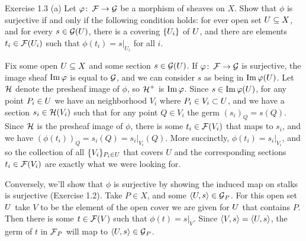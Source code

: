 
\begin{exercise}{Exercise 1.3 (a)}
    Let $\varphi \colon \operatorname{\mathcal{F}} \to \operatorname{\mathcal{G}}$ be a morphism of sheaves on $X$.
    Show that $\phi$ is surjective if and only if 
    the following condition holds: for ever open set $U \subseteq X$,
    and for every $s \in \operatorname{\mathcal{G}}(U)$, 
    there is a covering $\{U_i\}$ of $U$,
    and there are elements $t_i \in \operatorname{\mathcal{F}}(U_i)$
    such that $\phi(t_i) = s|_{U_i}$ for all $i$.
\end{exercise}
\begin{solution}
    Fix some open $U \subseteq X$ 
    and some section $s \in \operatorname{\mathcal{G}}(U)$.
    If $\varphi \colon \operatorname{\mathcal{F}} \to \operatorname{\mathcal{G}}$ is surjective,
    the image sheaf $\operatorname{Im} \varphi$ is equal to $\operatorname{\mathcal{G}}$,
    and we can consider $s$ as being in $\operatorname{Im}\varphi(U)$.
    Let $\operatorname{\mathcal{H}}$ denote the presheaf image of $\phi$,
    so $\operatorname{\mathcal{H}}^+$ is $\operatorname{Im}\varphi$.
    Since $s \in \operatorname{Im}\varphi(U)$, 
    for any point $P_i \in U$ we have an neighborhood $V_i$ 
    where $P_i \in V_i \subset U$,
    and we have a section $s_i \in \operatorname{\mathcal{H}}(V_i)$ such that
    for any point $Q \in V_i$ the germ $(s_i)_Q = s(Q)$.
    Since $\operatorname{\mathcal{H}}$ is the presheaf image of $\phi$, 
    there is some $t_i \in \operatorname{\mathcal{F}}(V_i)$ that maps to $s_i$,
    and we have $(\phi(t_i))_Q = s_i(Q) = s_i|_{V_i}(Q)$.
    More succinctly, $\phi(t_i) = s_i|_{V_i}$, 
    and so the collection of all $\{V_i\}_{P_i \in U}$ that covers $U$ 
    and the corresponding sections $t_i \in \operatorname{\mathcal{F}}(V_i)$ 
    are exactly what we were looking for.
    
    Conversely, we'll show that $\phi$ is surjective 
    by showing the induced map on stalks is surjective (Exercise 1.2).
    Take $P \in X$, and some $\langle U, s \rangle \in \operatorname{\mathcal{G}}_P$.
    For this open set $U$ take $V$ to be the element
    of the open cover we are given for $U$ that contains $P$. 
    Then there is some $t \in \operatorname{\mathcal{F}}(V)$ such that $\phi(t) = s|_V$.
    Since $\langle V, s \rangle = \langle U, s \rangle$,
    the germ of $t$ in $\operatorname{\mathcal{F}}_P$ 
    will map to $\langle U, s \rangle \in \operatorname{\mathcal{G}}_P$.
\end{solution}

